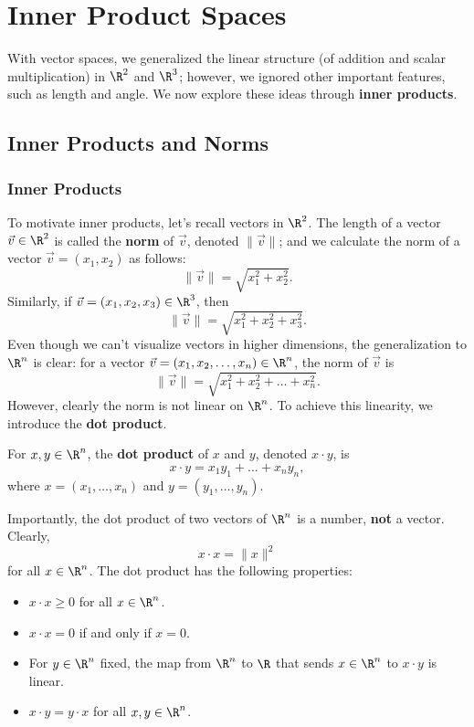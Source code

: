 \documentclass[math0540-lecture-notes.tex]{subfiles}
\begin{document}
\chapter{Inner Product Spaces}

With vector spaces, we generalized the linear structure (of addition and scalar multiplication) in
$\R^2$ and $\R^3$; however, we ignored other important features, such as length and angle. We now
explore these ideas through \textbf{inner products}.

\section{Inner Products and Norms}
\subsection{Inner Products}

To motivate inner products, let's recall vectors in $\R^2$. The length of a vector $\vec{v}\in \R^2$
is called the \textbf{norm} of $\vec{v}$, denoted $\|\vec{v}\|$; and we calculate the norm of a
vector $\vec{v}=(x_1,x_2)$ as follows: \[
  \|\vec{v}\|=\sqrt{x_1^2+x_2^2}
.\] Similarly, if $\vec{v}=(x_1,x_2,x_3)\in \R^3$, then \[
  \|\vec{v}\|=\sqrt{x_1^2+x_2^2+x_3^2}
.\] Even though we can't visualize vectors in higher dimensions, the generalization to $\R^n$ is
clear: for a vector $\vec{v}=(x_1,x_2,\ldots,x_n)\in \R^n$, the norm of $\vec{v}$ is \[
  \|\vec{v}\|=\sqrt{x_1^2+x_2^2+\ldots+x_n^2}
.\] However, clearly the norm is not linear on $\R^n$. To achieve this linearity, we introduce the
\textbf{dot product}.

\begin{definition}{}
  For $x,y\in \R^n$, the \textbf{dot product} of $x$ and $y$, denoted $x\cdot y$, is \[
    x\cdot y=x_1y_1+\ldots+x_ny_n
  ,\] where $x=(x_1,\ldots,x_n)$ and $y=(y_1,\ldots,y_n)$.
\end{definition}

Importantly, the dot product of two vectors of $\R^n$ is a number, \textbf{not} a vector. Clearly,
\[
  x\cdot x=\|x\|^2
\] for all $x\in \R^n$. The dot product has the following properties:
\begin{itemize}
  \item $x\cdot x\ge 0$ for all $x\in \R^n$.
  \item $x\cdot x=0$ if and only if $x=0$.
  \item For $y\in \R^n$ fixed, the map from $\R^n$ to $\R$ that sends $x\in \R^n$ to $x\cdot y$ is
    linear.
  \item $x\cdot y=y\cdot x$ for all $x,y\in \R^n$.
\end{itemize}
\end{document}
